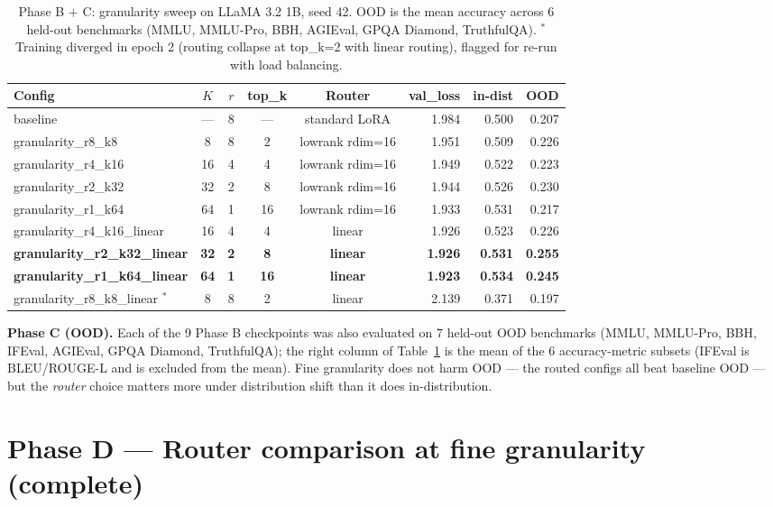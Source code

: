 \documentclass[10pt]{article}
\begin{document}
\begin{table}[h]
\centering\small
\begin{tabular}{@{}lccccrrr@{}}
\toprule
Config & $K$ & $r$ & top\_k & Router & val\_loss & in-dist & OOD \\
\midrule
baseline                  & --- & 8 & --- & standard LoRA   & 1.984 & 0.500 & 0.207 \\
granularity\_r8\_k8       &  8  & 8 &  2  & lowrank rdim=16 & 1.951 & 0.509 & 0.226 \\
granularity\_r4\_k16      & 16  & 4 &  4  & lowrank rdim=16 & 1.949 & 0.522 & 0.223 \\
granularity\_r2\_k32      & 32  & 2 &  8  & lowrank rdim=16 & 1.944 & 0.526 & 0.230 \\
granularity\_r1\_k64      & 64  & 1 & 16  & lowrank rdim=16 & 1.933 & 0.531 & 0.217 \\
granularity\_r4\_k16\_linear & 16 & 4 & 4  & linear          & 1.926 & 0.523 & 0.226 \\
\textbf{granularity\_r2\_k32\_linear} & \textbf{32} & \textbf{2} & \textbf{8} & \textbf{linear} & \textbf{1.926} & \textbf{0.531} & \textbf{0.255} \\
\textbf{granularity\_r1\_k64\_linear} & \textbf{64} & \textbf{1} & \textbf{16} & \textbf{linear} & \textbf{1.923} & \textbf{0.534} & \textbf{0.245} \\
granularity\_r8\_k8\_linear $^*$ & 8 & 8 & 2 & linear          & 2.139 & 0.371 & 0.197 \\
\bottomrule
\end{tabular}
\caption{Phase B + C: granularity sweep on LLaMA 3.2 1B, seed 42. OOD is the mean accuracy across 6 held-out benchmarks (MMLU, MMLU-Pro, BBH, AGIEval, GPQA Diamond, TruthfulQA). $^*$Training diverged in epoch 2 (routing collapse at top\_k=2 with linear routing), flagged for re-run with load balancing.}
\label{tab:phaseb}
\end{table}

\textbf{Phase C (OOD).} Each of the 9 Phase B checkpoints was also evaluated on 7 held-out OOD benchmarks (MMLU, MMLU-Pro, BBH, IFEval, AGIEval, GPQA Diamond, TruthfulQA); the right column of Table~\ref{tab:phaseb} is the mean of the 6 accuracy-metric subsets (IFEval is BLEU/ROUGE-L and is excluded from the mean). Fine granularity does not harm OOD --- the routed configs all beat baseline OOD --- but the \emph{router} choice matters more under distribution shift than it does in-distribution.

\section*{Phase D --- Router comparison at fine granularity (complete)}
\end{document}

